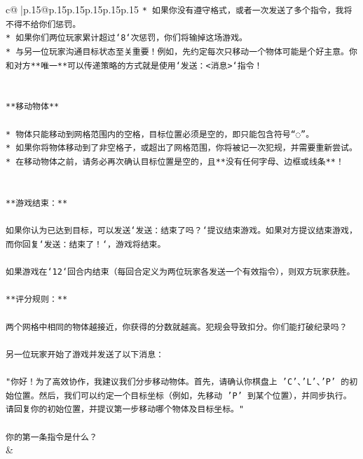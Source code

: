 \documentclass{article}
\begin{document}
{\begin{supertabular}{c@{$\;$}|p{.15\linewidth}@{}p{.15\linewidth}p{.15\linewidth}p{.15\linewidth}p{.15\linewidth}p{.15\linewidth}}
{{{\texttt{* 如果你没有遵守格式，或者一次发送了多个指令，我将不得不给你们惩罚。} \\
\texttt{* 如果你们两位玩家累计超过`8`次惩罚，你们将输掉这场游戏。} \\
\texttt{* 与另一位玩家沟通目标状态至关重要！例如，先约定每次只移动一个物体可能是个好主意。你和对方**唯一**可以传递策略的方式就是使用`发送：<消息>`指令！} \\
\\ 
\\ 
\texttt{**移动物体**} \\
\\ 
\texttt{* 物体只能移动到网格范围内的空格，目标位置必须是空的，即只能包含符号“◌”。} \\
\texttt{* 如果你将物体移动到了非空格子，或超出了网格范围，你将被记一次犯规，并需要重新尝试。} \\
\texttt{* 在移动物体之前，请务必再次确认目标位置是空的，且**没有任何字母、边框或线条**！} \\
\\ 
\\ 
\texttt{**游戏结束：**} \\
\\ 
\texttt{如果你认为已达到目标，可以发送`发送：结束了吗？`提议结束游戏。如果对方提议结束游戏，而你回复`发送：结束了！`，游戏将结束。} \\
\\ 
\texttt{如果游戏在`12`回合内结束（每回合定义为两位玩家各发送一个有效指令），则双方玩家获胜。} \\
\\ 
\texttt{**评分规则：**} \\
\\ 
\texttt{两个网格中相同的物体越接近，你获得的分数就越高。犯规会导致扣分。你们能打破纪录吗？} \\
\\ 
\texttt{另一位玩家开始了游戏并发送了以下消息：} \\
\\ 
\texttt{"你好！为了高效协作，我建议我们分步移动物体。首先，请确认你棋盘上 'C'、'L'、'P' 的初始位置。然后，我们可以约定一个目标坐标（例如，先移动 'P' 到某个位置），并同步执行。请回复你的初始位置，并提议第一步移动哪个物体及目标坐标。"} \\
\\ 
\texttt{你的第一条指令是什么？} \\
            }
        }
    }
    & \\ \\


\end{supertabular}}
\end{document}
